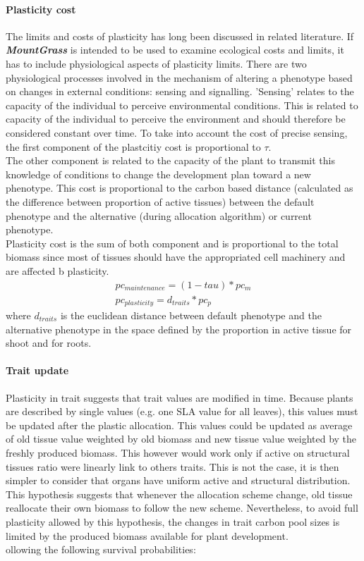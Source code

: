 \documentclass[a4paper,twoside, justified,marginals=raggedright, nobib]{tufte-handout}
\newcommand{\model}{\textit{\textbf{MountGrass }}}
\begin{document}
\paragraph{Plasticity cost}
The limits and costs of plasticity has long been discussed in related literature. If \model is intended to be used to examine ecological costs and limits, it has to include physiological aspects of plasticity limits. There are two physiological processes involved in the mechanism of altering a phenotype based on changes in external conditions: sensing and signalling. 'Sensing' relates to the capacity of the individual to perceive environmental conditions. This is related to capacity of the individual to perceive the environment and should therefore be considered constant over time. To take into account the cost of precise sensing, the first component of the plastcitiy cost is proportional to $\tau$.\\
The other component is related to the capacity of the plant to transmit this knowledge of conditions to change the development plan toward a new phenotype. This cost is proportional to the carbon based distance (calculated as the difference between proportion of active tissues) between the default phenotype and the alternative (during allocation algorithm) or current phenotype.\\
Plasticity cost is the sum of both component and is proportional to the total biomass since most of tissues should have the appropriated cell machinery and are affected b plasticity.
\begin{align}
pc_{maintenance} = (1 - tau) * pc_m \\
pc_{plasticity} = d_{traits} * pc_p
\end{align}
where $d_{traits}$ is the euclidean distance between default phenotype and the alternative phenotype in the space defined by the proportion in active tissue for shoot and for roots.

\paragraph{Trait update}
Plasticity in trait suggests that trait values are modified in time. Because plants are described by single values (e.g. one SLA value for all leaves), this values must be updated after the plastic allocation. This values could be updated as average of old tissue value weighted by old biomass and new tissue value weighted by the freshly produced biomass. This however would work only if active on structural tissues ratio were linearly link to others traits. This is not the case, it is then simpler to consider that organs have uniform active and structural distribution. This hypothesis suggests that whenever the allocation scheme change, old tissue reallocate their own biomass to follow the new scheme. Nevertheless, to avoid full plasticity allowed by this hypothesis, the changes in trait carbon pool sizes is limited by the produced biomass available for plant development.\\ollowing the following survival probabilities:
\end{document}
